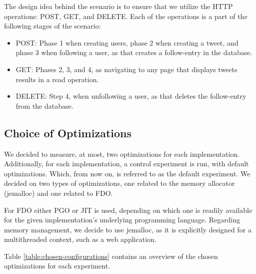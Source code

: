 \documentclass[main.tex]{subfiles}
\begin{document}
The design idea behind the scenario is to ensure that we utilize the HTTP operations: POST, GET, and DELETE. Each of the operations is a part of the following stages of the scenario:

\begin{itemize}
    \item POST: Phase 1 when creating users, phase 2 when creating a tweet, and phase 3 when following a user, as that creates a follow-entry in the database. 
    \item GET: Phases 2, 3, and 4, as navigating to any page that displays tweets results in a read operation.
    \item DELETE: Step 4, when unfollowing a user, as that deletes the follow-entry from the database.
\end{itemize}

\subsection{Choice of Optimizations}
We decided to measure, at most, two optimizations for each implementation. Additionally, for each implementation, a control experiment is run, with default optimizations. Which, from now on, is referred to as the default experiment. We decided on two types of optimizations, one related to the memory allocator (jemalloc) and one related to FDO.

For FDO either PGO or JIT is used, depending on which one is readily available for the given implementation's underlying programming language. Regarding memory management, we decide to use jemalloc, as it is explicitly designed for a multithreaded context, such as a web application.

Table \ref{table:chosen-configurations} contains an overview of the chosen optimizations for each experiment.
\end{document}
